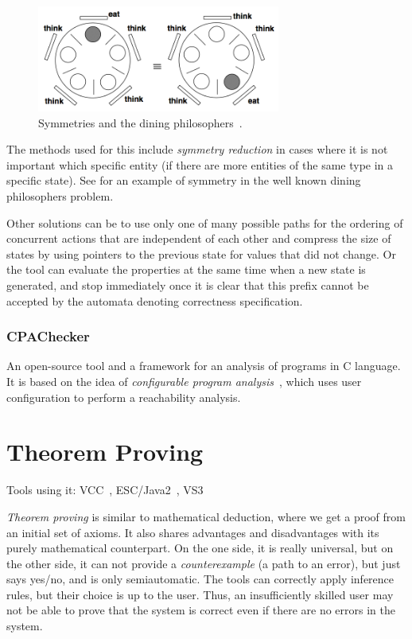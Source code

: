 \begin{figure}
  \centering
 \includegraphics[width=8cm,keepaspectratio]{fig/dinning-symmetry} %
\caption{Symmetries and the dining philosophers~\cite{KrenaVojnarOverview}.}
\label{fig:fav:dining}
\end{figure}

The methods used for this include {\em symmetry reduction} in cases where
it is not important which specific entity (if there are more entities of
the same type in a specific state). See  for an
example of symmetry in the well known dining philosophers problem.

Other solutions can be to use only one of many possible paths for the ordering of concurrent actions that are independent of each other and compress the size of states by using pointers to the previous state for values that did not change. Or the tool can evaluate the properties at the same time when a new state is generated, and stop immediately once it is clear that this prefix cannot be accepted by the automata denoting correctness specification.


\subsubsection{CPAChecker}

An open-source tool and a framework for an analysis of programs in C language. It is based on the idea of {\em configurable program analysis}~\cite{CPAChecker}, which uses user configuration to perform a reachability analysis.


\section{Theorem Proving}\label{chap:fav:theoremProving}
Tools using it: VCC~\cite{KrenaVojnarOverview}, ESC/Java2~\cite{KrenaVojnarOverview}, VS3~\cite{KrenaVojnarOverview}

{\em Theorem proving} is similar to mathematical deduction, where we get a proof from an initial set of axioms. It also shares advantages and disadvantages with its purely mathematical counterpart. On the one side, it is really universal, but on the other side, it can not provide a {\em counterexample} (a path to an error), but just says yes/no, and is only semiautomatic. The tools can correctly apply inference rules, but their choice is up to the user. Thus, an insufficiently skilled user may not be able to prove that the system is correct even if there are no errors in the system.


